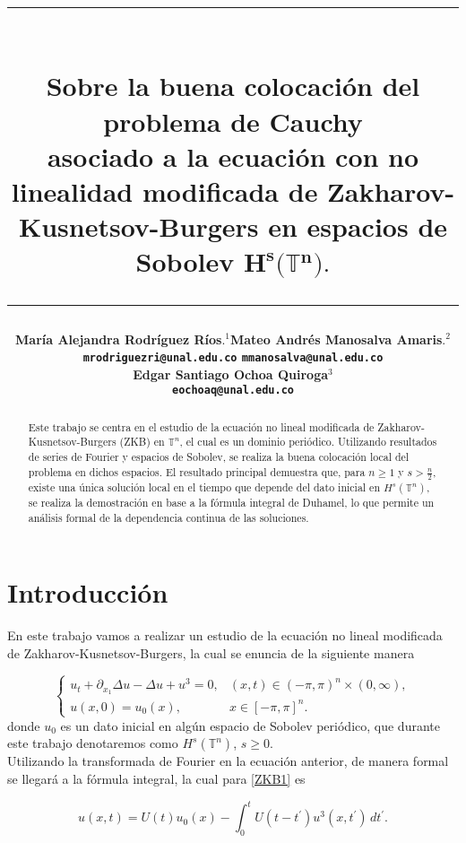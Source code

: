 \documentclass[12pt]{article}
\title{\vspace{-2cm}\par\noindent\rule{16cm}{1pt}\large
\\\bfseries Sobre la buena colocación del problema de Cauchy \\
asociado a la ecuación con no linealidad modificada de Zakharov-Kusnetsov-Burgers en espacios de Sobolev $\mathbf{H^s}\pmb{(}\pmb{\mathbb{T}}\mathbf{^n}\pmb{)}.$
\vspace{-0.34cm}\par\noindent\hspace{0.15cm}\rule{16cm}{1pt}
\vspace{-0.6cm}
}
\author{\small \bfseries María Alejandra Rodríguez Ríos$.^1$\quad \quad\small Mateo Andrés Manosalva Amaris$.^{2}$\\ \small \quad \texttt{mrodriguezri@unal.edu.co} \quad \quad \quad \quad \quad \quad \texttt{mmanosalva@unal.edu.co}\quad\quad \quad\\ \small \bfseries Edgar Santiago Ochoa Quiroga$^{3}$\\
\small \texttt{eochoaq@unal.edu.co}
}
\newcommand\T{\mathbb{T}}
\begin{document}
\maketitle
\begin{abstract}
Este trabajo se centra en el estudio de la ecuación no lineal modificada de Zakharov-Kusnetsov-Burgers (ZKB) en $\T^n$, el cual es un dominio periódico. Utilizando resultados de series de Fourier y espacios de Sobolev, se realiza la buena colocación local del problema en dichos espacios. El resultado principal demuestra que, para $n \geq 1$ y $s > \frac{n}{2}$, existe una única solución local en el tiempo que depende del dato inicial en $H^s(\mathbb{T}^n)$, se realiza la demostración en base a la fórmula integral de Duhamel, lo que permite un análisis formal de la dependencia continua de las soluciones.
\end{abstract}

\section{Introducción}
En este trabajo vamos a realizar un estudio de la ecuación no lineal modificada de Zakharov-Kusnetsov-Burgers, la cual se enuncia de la siguiente manera

\begin{equation}\label{ZKB1}
    \begin{cases}
    u_t+\partial_{x_1}\Delta u-\Delta u+u^3=0, & (x,t)\in(-\pi,\pi)^n\times(0,\infty),\\
    u(x,0)=u_0(x), & x\in[-\pi,\pi]^n.
\end{cases}
\end{equation}
donde $u_0$ es un dato inicial en algún espacio de Sobolev periódico, que durante este trabajo denotaremos como $H^s(\mathbb{T}^n)$, $s \geq 0$. \\

Utilizando la transformada de Fourier en la ecuación anterior, de manera formal  se llegará a la fórmula integral, la cual para \ref{ZKB1} es 

\begin{equation*}\label{Duhamel}
u(x,t)=U(t)u_0(x)-\int_0^tU(t-t^\prime)u^3(x,t^\prime)\,dt^\prime.
\end{equation*}
      
\end{document}
